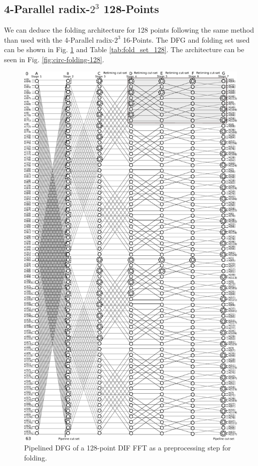 \documentclass[journal,comsoc]{IEEEtran}
\begin{document}
\subsection{4-Parallel radix-$2^3$ 128-Points}
We can deduce the folding architecture for 128 points following the same method than used with the 4-Parallel radix-$2^3$ 16-Points. The DFG and folding set used can be shown in Fig. \ref{fig:pipe_dfg_128} and Table \ref{tab:fold_set_128}.
The architecture can be seen in Fig. \ref{fig:circ-folding-128}.
\begin{figure}[t!]
\centering
 \includegraphics[width=\linewidth]{Diagramas/miSeccionFiguras/128puntosRadix8BurbujasPipelined_Kevin.pdf}
\caption{Pipelined DFG of a 128-point DIF FFT as a preprocessing step for folding.}
\label{fig:pipe_dfg_128}
\end{figure}
\end{document}
